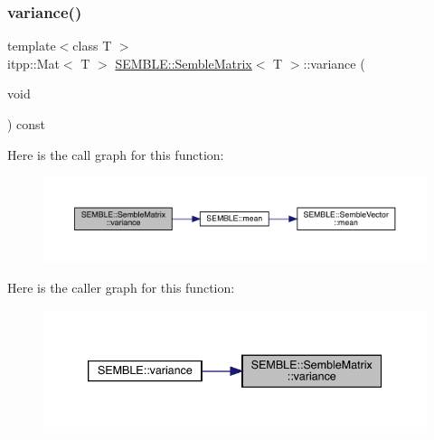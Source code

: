 \mbox{\label{structSEMBLE_1_1SembleMatrix_a62af996687fe0bd0444fc4360b1b651f}} 
\subsubsection{\texorpdfstring{variance()}{variance()}\hspace{0.1cm}{\footnotesize\ttfamily [2/2]}}
{\footnotesize\ttfamily template$<$class T $>$ \\
itpp\+::\+Mat$<$ T $>$ \mbox{\hyperlink{structSEMBLE_1_1SembleMatrix}{S\+E\+M\+B\+L\+E\+::\+Semble\+Matrix}}$<$ T $>$\+::variance (\begin{DoxyParamCaption}\item[{void}]{ }\end{DoxyParamCaption}) const}

Here is the call graph for this function\+:
\nopagebreak
\begin{figure}[H]
\begin{center}
\leavevmode
\includegraphics[width=350pt]{df/d87/structSEMBLE_1_1SembleMatrix_a62af996687fe0bd0444fc4360b1b651f_cgraph}
\end{center}
\end{figure}
Here is the caller graph for this function\+:
\nopagebreak
\begin{figure}[H]
\begin{center}
\leavevmode
\includegraphics[width=339pt]{df/d87/structSEMBLE_1_1SembleMatrix_a62af996687fe0bd0444fc4360b1b651f_icgraph}
\end{center}
\end{figure}
\mbox{\label{structSEMBLE_1_1SembleMatrix_a1b6d5a9a3816e9d98eb55a71a5fa1a5f}} 
